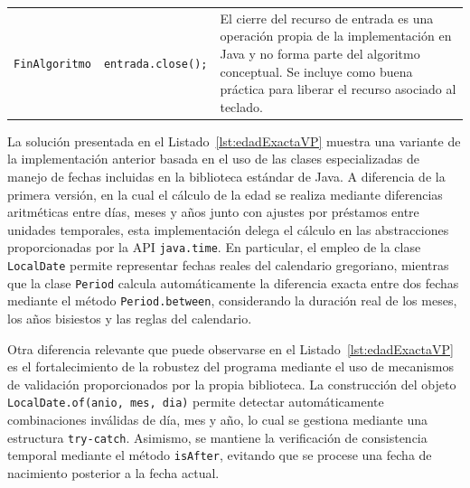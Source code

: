 \documentclass[12pt,twoside]{book}
\begin{document}
\begin{landscape}
\begin{longtable}{p{6cm} p{6cm} p{7cm}}
							
							\texttt{FinAlgoritmo}
							&
							\texttt{entrada.close();}
							&
							El cierre del recurso de entrada es una operación propia de la implementación en Java y no forma parte del algoritmo conceptual. Se incluye como buena práctica para liberar el recurso asociado al teclado. \\
							
						\end{longtable}
						
					\end{landscape}
					
					\noindent
					La solución presentada en el Listado~\ref{lst:edadExactaVP} muestra una variante de la implementación anterior basada en el uso de las clases especializadas de manejo de fechas incluidas en la biblioteca estándar de Java. A diferencia de la primera versión, en la cual el cálculo de la edad se realiza mediante diferencias aritméticas entre días, meses y años junto con ajustes por préstamos entre unidades temporales, esta implementación delega el cálculo en las abstracciones proporcionadas por la API \texttt{java.time}. En particular, el empleo de la clase \texttt{LocalDate} permite representar fechas reales del calendario gregoriano, mientras que la clase \texttt{Period} calcula automáticamente la diferencia exacta entre dos fechas mediante el método \texttt{Period.between}, considerando la duración real de los meses, los años bisiestos y las reglas del calendario.
					
					Otra diferencia relevante que puede observarse en el Listado~\ref{lst:edadExactaVP} es el fortalecimiento de la robustez del programa mediante el uso de mecanismos de validación proporcionados por la propia biblioteca. La construcción del objeto \texttt{LocalDate.of(anio, mes, dia)} permite detectar automáticamente combinaciones inválidas de día, mes y año, lo cual se gestiona mediante una estructura \texttt{try-catch}. Asimismo, se mantiene la verificación de consistencia temporal mediante el método \texttt{isAfter}, evitando que se procese una fecha de nacimiento posterior a la fecha actual.
					
\end{document}
